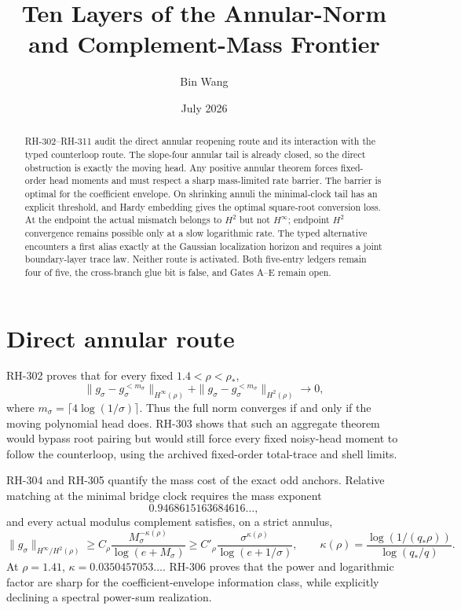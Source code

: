 \documentclass[11pt]{article}
\title{Ten Layers of the Annular-Norm and Complement-Mass Frontier}
\author{Bin Wang}\date{July 2026}
\theoremstyle{remark}\newtheorem{remark}[proposition]{Remark}
\begin{document}
\maketitle
\begin{abstract}
RH-302--RH-311 audit the direct annular reopening route and its interaction
with the typed counterloop route.  The slope-four annular tail is already
closed, so the direct obstruction is exactly the moving head.  Any positive
annular theorem forces fixed-order head moments and must respect a sharp
mass-limited rate barrier.  The barrier is optimal for the coefficient
envelope.  On shrinking annuli the minimal-clock tail has an explicit
threshold, and Hardy embedding gives the optimal square-root conversion
loss.  At the endpoint the actual mismatch belongs to $H^2$ but not
$H^\infty$; endpoint $H^2$ convergence remains possible only at a slow
logarithmic rate.  The typed alternative encounters a first alias exactly at
the Gaussian localization horizon and requires a joint boundary-layer trace
law.  Neither route is activated.  Both five-entry ledgers remain four of
five, the cross-branch glue bit is false, and Gates A--E remain open.
\end{abstract}

\section{Direct annular route}
RH-302 proves that for every fixed $1.4<\rho<\rho_*$,
\[
 \|g_\sigma-g_\sigma^{<m_\sigma}\|_{H^\infty(\rho)}
 +\|g_\sigma-g_\sigma^{<m_\sigma}\|_{H^2(\rho)}
 \longrightarrow0,
\]
where $m_\sigma=\lceil4\log(1/\sigma)\rceil$.  Thus the full norm converges
if and only if the moving polynomial head does.  RH-303 shows that such an
aggregate theorem would bypass root pairing but would still force every
fixed noisy-head moment to follow the counterloop, using the archived
fixed-order total-trace and shell limits.

RH-304 and RH-305 quantify the mass cost of the exact odd anchors.  Relative
matching at the minimal bridge clock requires the mass exponent
\[
 0.9468615163684616\ldots,
\]
and every actual modulus complement satisfies, on a strict annulus,
\[
\|g_\sigma\|_{H^\infty/H^2(\rho)}
 \ge C_\rho
 \frac{M_\sigma^{-\kappa(\rho)}}{\log(e+M_\sigma)}
 \ge C'_\rho\frac{\sigma^{\kappa(\rho)}}
 {\log(e+1/\sigma)},\qquad
 \kappa(\rho)=
 \frac{\log(1/(q_*\rho))}{\log(q_*/q)}.
\]
At $\rho=1.41$, $\kappa=0.0350457053\ldots$.  RH-306 proves that the power
and logarithmic factor are sharp for the coefficient-envelope information
class, while explicitly declining a spectral power-sum realization.
\end{document}
